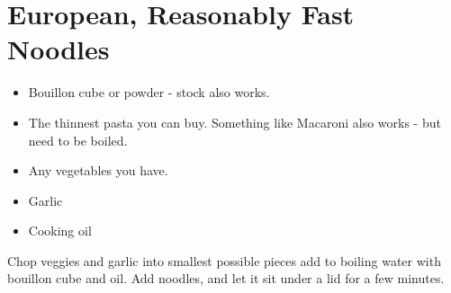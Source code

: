 \section{European, Reasonably Fast Noodles}{
  \begin{itemize}
    \item Bouillon cube or powder - stock also works.
    \item The thinnest pasta you can buy. Something like Macaroni also works
      - but need to be boiled.
    \item Any vegetables you have.
    \item Garlic
    \item Cooking oil
  \end{itemize}
  \vspace{.25in}

  Chop veggies and garlic into smallest possible pieces add to
  boiling water with
  bouillon cube and oil. Add noodles, and let it sit under a lid for
  a few minutes.

}
